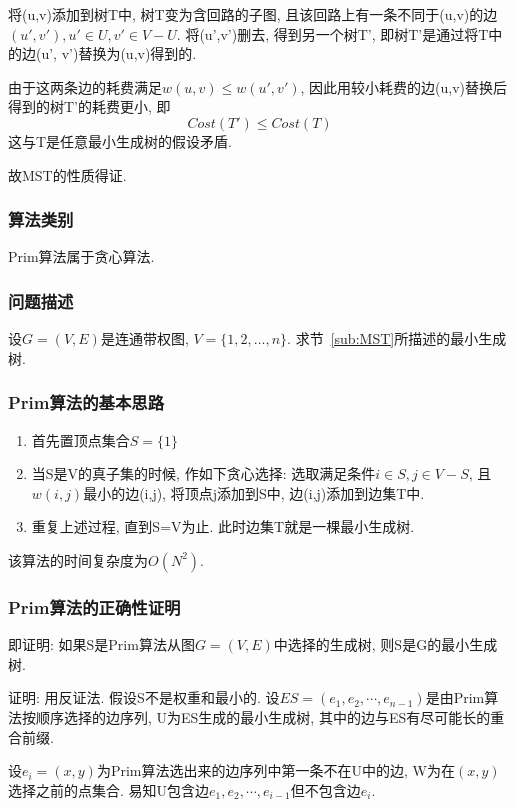 将(u,v)添加到树T中, 树T变为含回路的子图,
且该回路上有一条不同于(u,v)的边$(u',v'), u'\in U, v'\in V-U$. 将(u',v')删去,
得到另一个树T', 即树T'是通过将T中的边(u', v')替换为(u,v)得到的.\par

由于这两条边的耗费满足$w(u,v)\leq w(u',v')$,
因此用较小耗费的边(u,v)替换后得到的树T'的耗费更小, 即
\begin{equation}
	Cost(T')\leq Cost(T)
\end{equation}
这与T是任意最小生成树的假设矛盾.\par
故MST的性质得证.

\subsubsection{算法类别}
Prim算法属于贪心算法.

\subsubsection{问题描述}
设$G=(V,E)$是连通带权图, $V=\{1,2,\dots,n\}$. 求节~\ref{sub:MST}所描述的最小生成树.

\subsubsection{Prim算法的基本思路}
\begin{enumerate}
	\item 首先置顶点集合$S=\{1\}$
	\item 当S是V的真子集的时候, 作如下贪心选择: 选取满足条件$i\in S, j\in V-S$,
	      且$w(i,j)$最小的边(i,j), 将顶点j添加到S中, 边(i,j)添加到边集T中.
	\item 重复上述过程, 直到S=V为止. 此时边集T就是一棵最小生成树.
\end{enumerate}
该算法的时间复杂度为$O(N^2)$.


\subsubsection{Prim算法的正确性证明}
即证明: 如果S是Prim算法从图$G=(V,E)$中选择的生成树, 则S是G的最小生成树.\par
证明: 用反证法. 假设S不是权重和最小的.
设$ES=(e_1,e_2,\cdots,e_{n-1})$是由Prim算法按顺序选择的边序列,
U为ES生成的最小生成树, 其中的边与ES有尽可能长的重合前缀.\par

设$e_i=(x,y)$为Prim算法选出来的边序列中第一条不在U中的边,
W为在$(x,y)$选择之前的点集合.
易知U包含边$e_1,e_2,\cdots,e_{i-1}$但不包含边$e_{i}$.\par

